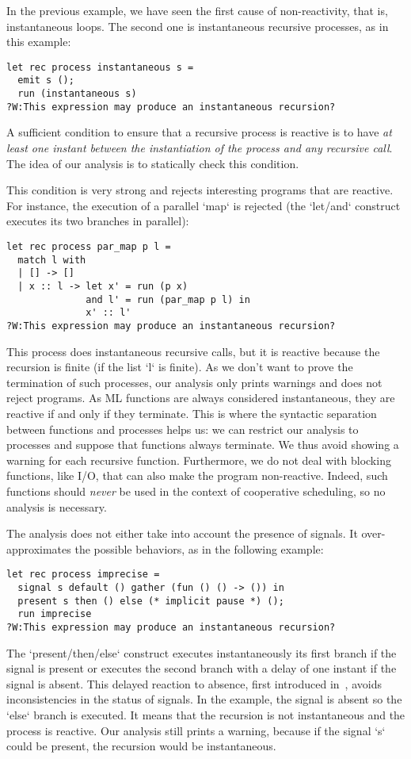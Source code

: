\documentclass[9pt,preprint]{sigplanconf}
\begin{document}
In the previous example, we have seen the first cause of non-reactivity, that is, instantaneous loops. The second one is instantaneous recursive processes, as in this example:
\begin{lstlisting}
let rec process instantaneous s =
  emit s ();
  run (instantaneous s)
?W:This expression may produce an instantaneous recursion?
\end{lstlisting}

A sufficient condition to ensure that a recursive process is reactive is to have \emph{at least one instant between the instantiation of the process and any recursive call}. The idea of our analysis is to statically check this condition.

This condition is very strong and rejects interesting programs that are reactive. For instance, the execution of a parallel `map` is rejected (the `let/and` construct executes its two branches in parallel):
\begin{lstlisting}
let rec process par_map p l =
  match l with
  | [] -> []
  | x :: l -> let x' = run (p x)
              and l' = run (par_map p l) in
              x' :: l'
?W:This expression may produce an instantaneous recursion?
\end{lstlisting}
This process does instantaneous recursive calls, but it is reactive because the recursion is finite (if the list `l` is finite). As we don't want to prove the termination of such processes, our analysis only prints warnings and does not reject programs. As ML functions are always considered instantaneous, they are reactive if and only if they terminate. This is where the syntactic separation between functions and processes helps us: we can restrict our analysis to processes and suppose that functions always terminate.
We thus avoid showing a warning for each recursive function.
%
Furthermore, we do not deal with blocking functions, like I/O, that can also make the program non-reactive. Indeed, such functions should \emph{never} be used in the context of cooperative scheduling, so no analysis is necessary.

The analysis does not either take into account the presence of signals. It over-approximates the possible behaviors, as in the following example:
\begin{lstlisting}
let rec process imprecise =
  signal s default () gather (fun () () -> ()) in
  present s then () else (* implicit pause *) ();
  run imprecise
?W:This expression may produce an instantaneous recursion?
\end{lstlisting}
%
The `present/then/else` construct executes instantaneously its first branch if the signal is present or executes the second branch with a delay of one instant if the signal is absent. This delayed reaction to absence, first introduced in~\cite{Boussinot:1991}, avoids inconsistencies in the status of signals. In the example, the signal is absent so the `else` branch is executed. It means that the recursion is not instantaneous and the process is reactive. Our analysis still prints a warning, because if the signal `s` could be present, the recursion would be instantaneous.
\end{document}
